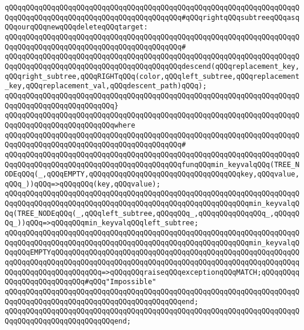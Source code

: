 \verb|qQQqqQQqqQQqqQQqqQQqqQQqqQQqqQQqqQQqqQQqqQQqqQQqqQQqqQQqqQQqqQQqqQQqqQQqqQQqqQQqqQQqqQQqqQQqqQQqqQQqqQQqqQQqqQQq#qQQqrightqQQqsubtreeqQQqasqQQqourqQQqnewqQQqdeleteqQQqtarget:|\newline
\verb|qQQqqQQqqQQqqQQqqQQqqQQqqQQqqQQqqQQqqQQqqQQqqQQqqQQqqQQqqQQqqQQqqQQqqQQqqQQqqQQqqQQqqQQqqQQqqQQqqQQqqQQqqQQqqQQq#|\newline
\verb|qQQqqQQqqQQqqQQqqQQqqQQqqQQqqQQqqQQqqQQqqQQqqQQqqQQqqQQqqQQqqQQqqQQqqQQqqQQqqQQqqQQqqQQqqQQqqQQqqQQqqQQqqQQqqQQqdescend(qQQqreplacement_key,qQQqright_subtree,qQQqRIGHTqQQq(color,qQQqleft_subtree,qQQqreplacement_key,qQQqreplacement_val,qQQqdescent_path)qQQq);|\newline
\verb|qQQqqQQqqQQqqQQqqQQqqQQqqQQqqQQqqQQqqQQqqQQqqQQqqQQqqQQqqQQqqQQqqQQqqQQqqQQqqQQqqQQqqQQqqQQqqQQq}|\newline
\verb|qQQqqQQqqQQqqQQqqQQqqQQqqQQqqQQqqQQqqQQqqQQqqQQqqQQqqQQqqQQqqQQqqQQqqQQqqQQqqQQqqQQqqQQqqQQqqQQqwhere|\newline
\verb|qQQqqQQqqQQqqQQqqQQqqQQqqQQqqQQqqQQqqQQqqQQqqQQqqQQqqQQqqQQqqQQqqQQqqQQqqQQqqQQqqQQqqQQqqQQqqQQqqQQqqQQqqQQqqQQq#|\newline
\verb|qQQqqQQqqQQqqQQqqQQqqQQqqQQqqQQqqQQqqQQqqQQqqQQqqQQqqQQqqQQqqQQqqQQqqQQqqQQqqQQqqQQqqQQqqQQqqQQqqQQqqQQqqQQqqQQqfunqQQqmin_keyvalqQQq(TREE_NODEqQQq(_,qQQqEMPTY,qQQqqQQqqQQqqQQqqQQqqQQqqQQqqQQqqQQqkey,qQQqvalue,qQQq_))qQQq=>qQQqqQQq(key,qQQqvalue);|\newline
\verb|qQQqqQQqqQQqqQQqqQQqqQQqqQQqqQQqqQQqqQQqqQQqqQQqqQQqqQQqqQQqqQQqqQQqqQQqqQQqqQQqqQQqqQQqqQQqqQQqqQQqqQQqqQQqqQQqqQQqqQQqqQQqqQQqmin_keyvalqQQq(TREE_NODEqQQq(_,qQQqleft_subtree,qQQqqQQq_,qQQqqQQqqQQqqQQq_,qQQqqQQq_))qQQq=>qQQqqQQqmin_keyvalqQQqleft_subtree;|\newline
\newline
\verb|qQQqqQQqqQQqqQQqqQQqqQQqqQQqqQQqqQQqqQQqqQQqqQQqqQQqqQQqqQQqqQQqqQQqqQQqqQQqqQQqqQQqqQQqqQQqqQQqqQQqqQQqqQQqqQQqqQQqqQQqqQQqqQQqmin_keyvalqQQqqQQqEMPTYqQQqqQQqqQQqqQQqqQQqqQQqqQQqqQQqqQQqqQQqqQQqqQQqqQQqqQQqqQQqqQQqqQQqqQQqqQQqqQQqqQQqqQQqqQQqqQQqqQQqqQQqqQQqqQQqqQQqqQQqqQQqqQQqqQQqqQQqqQQqqQQqqQQqqQQq=>qQQqqQQqraiseqQQqexceptionqQQqMATCH;qQQqqQQqqQQqqQQqqQQqqQQqqQQq#qQQq"Impossible"|\newline
\verb|qQQqqQQqqQQqqQQqqQQqqQQqqQQqqQQqqQQqqQQqqQQqqQQqqQQqqQQqqQQqqQQqqQQqqQQqqQQqqQQqqQQqqQQqqQQqqQQqqQQqqQQqqQQqqQQqend;|\newline
\verb|qQQqqQQqqQQqqQQqqQQqqQQqqQQqqQQqqQQqqQQqqQQqqQQqqQQqqQQqqQQqqQQqqQQqqQQqqQQqqQQqqQQqqQQqqQQqqQQqend;|\newline
